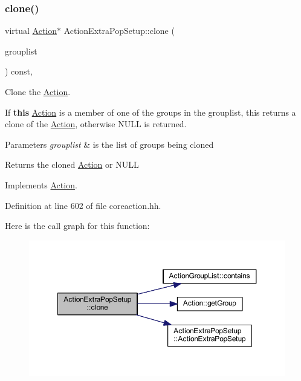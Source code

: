 \subsubsection{\texorpdfstring{clone()}{clone()}}
{\footnotesize\ttfamily virtual \mbox{\hyperlink{class_action}{Action}}$\ast$ Action\+Extra\+Pop\+Setup\+::clone (\begin{DoxyParamCaption}\item[{const \mbox{\hyperlink{class_action_group_list}{Action\+Group\+List}} \&}]{grouplist }\end{DoxyParamCaption}) const\hspace{0.3cm}{\ttfamily [inline]}, {\ttfamily [virtual]}}



Clone the \mbox{\hyperlink{class_action}{Action}}. 

If {\bfseries{this}} \mbox{\hyperlink{class_action}{Action}} is a member of one of the groups in the grouplist, this returns a clone of the \mbox{\hyperlink{class_action}{Action}}, otherwise N\+U\+LL is returned. 
\begin{DoxyParams}{Parameters}
{\em grouplist} & is the list of groups being cloned \\
\hline
\end{DoxyParams}
\begin{DoxyReturn}{Returns}
the cloned \mbox{\hyperlink{class_action}{Action}} or N\+U\+LL 
\end{DoxyReturn}


Implements \mbox{\hyperlink{class_action_af8242e41d09e5df52f97df9e65cc626f}{Action}}.



Definition at line 602 of file coreaction.\+hh.

Here is the call graph for this function\+:
\nopagebreak
\begin{figure}[H]
\begin{center}
\leavevmode
\includegraphics[width=350pt]{class_action_extra_pop_setup_aa4e0ef3d72672cf8fad9dea555a99cb8_cgraph}
\end{center}
\end{figure}


